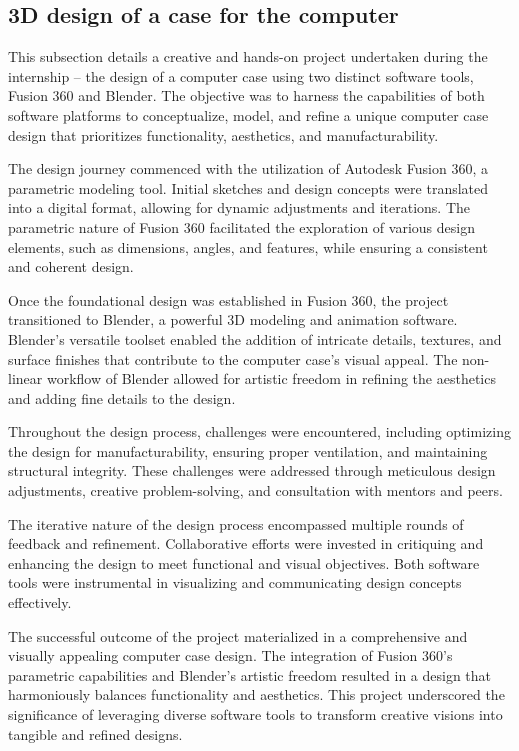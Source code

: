 \subsection{3D design of a case for the computer}
This subsection details a creative and hands-on project undertaken during the internship – the design of a computer case using two distinct software tools, Fusion 360 and Blender. The objective was to harness the capabilities of both software platforms to conceptualize, model, and refine a unique computer case design that prioritizes functionality, aesthetics, and manufacturability.

The design journey commenced with the utilization of Autodesk Fusion 360, a parametric modeling tool. Initial sketches and design concepts were translated into a digital format, allowing for dynamic adjustments and iterations. The parametric nature of Fusion 360 facilitated the exploration of various design elements, such as dimensions, angles, and features, while ensuring a consistent and coherent design.

Once the foundational design was established in Fusion 360, the project transitioned to Blender, a powerful 3D modeling and animation software. Blender's versatile toolset enabled the addition of intricate details, textures, and surface finishes that contribute to the computer case's visual appeal. The non-linear workflow of Blender allowed for artistic freedom in refining the aesthetics and adding fine details to the design.

Throughout the design process, challenges were encountered, including optimizing the design for manufacturability, ensuring proper ventilation, and maintaining structural integrity. These challenges were addressed through meticulous design adjustments, creative problem-solving, and consultation with mentors and peers.

The iterative nature of the design process encompassed multiple rounds of feedback and refinement. Collaborative efforts were invested in critiquing and enhancing the design to meet functional and visual objectives. Both software tools were instrumental in visualizing and communicating design concepts effectively.

The successful outcome of the project materialized in a comprehensive and visually appealing computer case design. The integration of Fusion 360's parametric capabilities and Blender's artistic freedom resulted in a design that harmoniously balances functionality and aesthetics. This project underscored the significance of leveraging diverse software tools to transform creative visions into tangible and refined designs.
